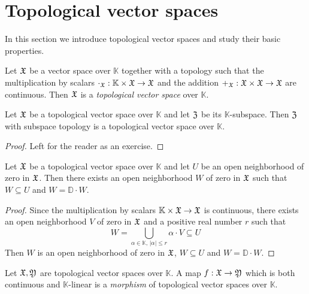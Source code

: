 \documentclass[10pt]{amsart}
\begin{document}
\section{Topological vector spaces}
\noindent
In this section we introduce topological vector spaces and study their basic properties.

\begin{definition}
	Let ${\mathfrak X}$ be a vector space over $\mathbb{K}$ together with a topology such that the multiplication by scalars $\cdot_{{\mathfrak X}}:\mathbb{K}\times {\mathfrak X} \rightarrow {\mathfrak X}$ and the addition $+_{{\mathfrak X}}:{\mathfrak X}\times {\mathfrak X}\rightarrow {\mathfrak X}$ are continuous. Then ${\mathfrak X}$ is a \textit{topological vector space} over $\mathbb{K}$.
\end{definition}

\begin{fact}\label{fact:topological_vector_subspaces}
	Let ${\mathfrak X}$ be a topological vector space over $\mathbb{K}$ and let ${\mathfrak Z}$ be its $\mathbb{K}$-subspace. Then ${\mathfrak Z}$ with subspace topology is a topological vector space over $\mathbb{K}$.
\end{fact}
\begin{proof}
	Left for the reader as an exercise.
\end{proof}

\begin{fact}\label{fact:supercircled_open_basis_at_zero}
	Let ${\mathfrak X}$ be a topological vector space over $\mathbb{K}$ and let $U$ be an open neighborhood of zero in ${\mathfrak X}$. Then there exists an open neighborhood $W$ of zero in ${\mathfrak X}$ such that $W \subseteq U$ and $W = \mathbb{D}\cdot W$.
\end{fact}
\begin{proof}
	Since the multiplication by scalars $\mathbb{K}\times {\mathfrak X} \rightarrow {\mathfrak X}$ is continuous, there exists an open neighborhood $V$ of zero in ${\mathfrak X}$ and a positive real number $r$ such that
	$$W = \bigcup_{\alpha\in \mathbb{K},\,|\alpha| \leq r}\alpha \cdot V \subseteq U$$
	Then $W$ is an open neighborhood of zero in ${\mathfrak X}$, $W\subseteq U$ and $W = \mathbb{D}\cdot W$.
\end{proof}

\begin{definition}
	Let ${\mathfrak X},{\mathfrak Y}$ are topological vector spaces over $\mathbb{K}$. A map $f:{\mathfrak X}\rightarrow {\mathfrak Y}$ which is both continuous and $\mathbb{K}$-linear is a \textit{morphism} of topological vector spaces over $\mathbb{K}$.
\end{definition}
\end{document}
